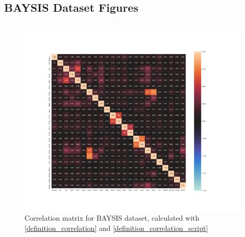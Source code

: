 \documentclass[a4paper,12pt]{report}
\newcommand{\nocontentsline}[3]{}
\newcommand{\tocless}[2]{\bgroup\let\addcontentsline=\nocontentsline#1{#2}\egroup}
\begin{document}
\begin{appendices}

\chapter{BAYSIS Dataset Figures}
\label{appendix_baysis}

\tocless\section{}
\label{appendix_baysis_dataset_corr_cramers}
\begin{figure}[H]
	\centering
	\includegraphics[scale=0.3]{../CorrAnalysis/data/BAYSIS/dataset/plots/baysis_dataset_corr_cramers}
	\caption{Correlation matrix for BAYSIS dataset, calculated with \ref{definition_correlation} and \ref{definition_correlation_script}}
	\label{img:appendix_correlation_matrix_dataset}
\end{figure}


\end{appendices}
\end{document}
